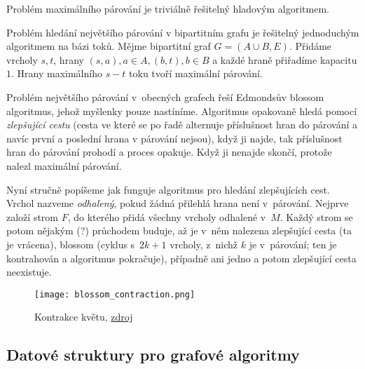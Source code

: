 Problém maximálního párování je triviálně řešitelný hladovým
algoritmem.

Problém hledání největšího párování v bipartitním grafu je řešitelný
jednoduchým algoritmem na bázi toků. Mějme bipartitní graf
$G = (A \cup B, E)$. Přidáme vrcholy $s, t$,
hrany $(s, a), a \in A, (b, t), b \in B$ a každé hraně přiřadíme
kapacitu $1$. Hrany maximálního $s-t$ toku tvoří maximální párování.


Problém největšího párování v~obecných grafech řeší Edmondsův blossom
algoritmus, jehož myšlenky pouze nastíníme.
Algoritmus opakovaně hledá pomocí {\em zlepšující
cestu} (cesta ve které
se po řadě alternuje příslušnost hran do párování a navíc první a
poslední hrana v párování nejsou), když ji najde, tak příslušnost hran do
párování prohodí a proces opakuje. Když ji nenajde skončí, protože
nalezl maximální párování.

Nyní stručně popíšeme jak funguje algoritmus pro hledání zlepšujících
cest. Vrchol nazveme {\em odhalený}, pokud žádná přilehlá hrana není v~párování.
Nejprve založí strom $F$, do kterého přidá všechny vrcholy odhalené
v~$M$. Každý strom se potom nějakým (?) průchodem buduje, až je v~něm nalezena zlepšující
cesta (ta je vrácena), blossom (cyklus s~$2k+1$ vrcholy, z~nichž $k$ je
v~párování; ten je kontrahován a algoritmus pokračuje), případně ani
jedno a potom zlepšující cesta neexistuje.

\begin{figure}[H]
    \centering
    \texttt{[image: blossom\_contraction.png]}
    \caption{Kontrakce květu, \href{https://en.wikipedia.org/wiki/Blossom_algorithm}{zdroj}}
\end{figure}



\subsection{Datové struktury pro grafové algoritmy}
\label{subsec:data_structures}

